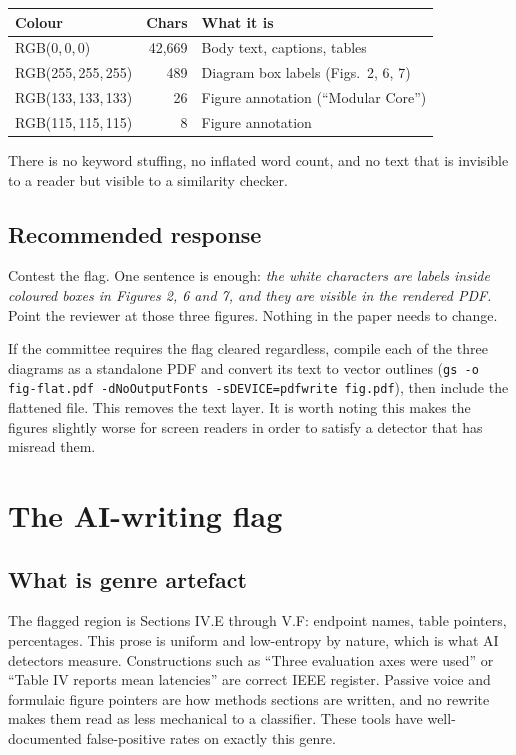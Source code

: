 \documentclass[11pt,a4paper]{article}
\begin{document}
\begin{center}
\begin{tabular}{@{}lrl@{}}
\toprule
\textbf{Colour} & \textbf{Chars} & \textbf{What it is} \\
\midrule
RGB(0,\,0,\,0)       & 42{,}669 & Body text, captions, tables \\
RGB(255,\,255,\,255) & 489      & Diagram box labels (Figs.\ 2, 6, 7) \\
RGB(133,\,133,\,133) & 26       & Figure annotation (``Modular Core'') \\
RGB(115,\,115,\,115) & 8        & Figure annotation \\
\bottomrule
\end{tabular}
\end{center}

\noindent
There is no keyword stuffing, no inflated word count, and no text that is
invisible to a reader but visible to a similarity checker.

\subsection*{Recommended response}

Contest the flag. One sentence is enough: \emph{the white characters are labels
inside coloured boxes in Figures 2, 6 and 7, and they are visible in the
rendered PDF.} Point the reviewer at those three figures. Nothing in the paper
needs to change.

If the committee requires the flag cleared regardless, compile each of the three
diagrams as a standalone PDF and convert its text to vector outlines
(\texttt{gs -o fig-flat.pdf -dNoOutputFonts -sDEVICE=pdfwrite fig.pdf}), then
include the flattened file. This removes the text layer. It is worth noting this
makes the figures slightly worse for screen readers in order to satisfy a
detector that has misread them.

\section{The AI-writing flag}

\subsection*{What is genre artefact}

The flagged region is Sections IV.E through V.F: endpoint names, table
pointers, percentages. This prose is uniform and low-entropy by nature, which
is what AI detectors measure. Constructions such as ``Three evaluation axes were
used'' or ``Table IV reports mean latencies'' are correct IEEE register. Passive
voice and formulaic figure pointers are how methods sections are written, and no
rewrite makes them read as less mechanical to a classifier. These tools have
well-documented false-positive rates on exactly this genre.
\end{document}
